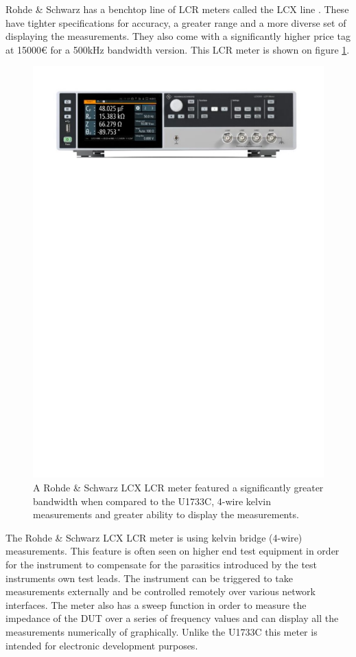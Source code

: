 Rohde \& Schwarz has a benchtop line of LCR meters called the LCX line \cite{RSLCXLCRMeters}. These have tighter specifications for accuracy, a greater range and a more diverse set of displaying the measurements. They also come with a significantly higher price tag at 15000€ for a 500kHz bandwidth version. This LCR meter is shown on figure \ref{fig:2_2_RSLCX}.
\begin{figure}[H]
    \centering
    \includegraphics[clip, trim=0 630 0 50, width=1\textwidth]{Sections/2_ProblemAnalysis/FIgures/RSLCXLCR.pdf}
    \caption{A Rohde \& Schwarz LCX LCR meter featured a significantly greater bandwidth when compared to the U1733C, 4-wire kelvin measurements and greater ability to display the measurements.\cite{RSLCXLCRMeters}}
    \label{fig:2_2_RSLCX}
\end{figure}

The Rohde \& Schwarz LCX LCR meter is using kelvin bridge (4-wire) measurements.  This feature is often seen on higher end test equipment in order for the instrument to compensate for the parasitics introduced by the test instruments own test leads. The instrument can be triggered to take measurements externally and be controlled remotely over various network interfaces. The meter also has a sweep function in order to measure the impedance of the DUT over a series of frequency values and can display all the measurements numerically of graphically. Unlike the U1733C this meter is intended for electronic development purposes.

